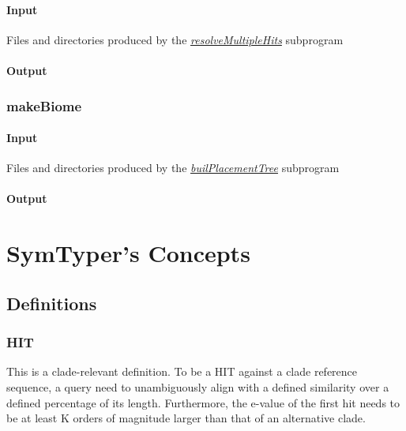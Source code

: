 \documentclass[letterpaper,10pt,english]{sphinxmanual}
\begin{document}
\subsubsection{Input}
\label{CommanLine:id8}
Files and directories produced by the {\hyperref[CommanLine:resolvemultiplehits]{\emph{resolveMultipleHits}}} subprogram


\subsubsection{Output}
\label{CommanLine:id9}

\subsection{makeBiome}
\label{CommanLine:id10}\label{CommanLine:makebiome}

\subsubsection{Input}
\label{CommanLine:id11}
Files and directories produced by the {\hyperref[CommanLine:builplacementtree]{\emph{builPlacementTree}}} subprogram


\subsubsection{Output}
\label{CommanLine:id12}

\chapter{SymTyper's Concepts}
\label{defs::doc}\label{defs:symtyper-s-concepts}

\section{Definitions}
\label{defs:definitions}

\subsection{HIT}
\label{defs:hits}\label{defs:hit}
This is a clade-relevant definition. To be a HIT against a clade reference sequence, a query need to unambiguously align with a defined similarity over a defined percentage of its length.
Furthermore, the e-value of the first hit needs to be at least K orders of magnitude larger than that of an alternative clade.
\end{document}
